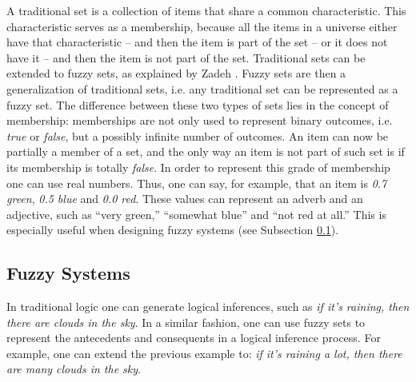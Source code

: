 A traditional set is a collection of items that share a common
characteristic. This characteristic serves as a membership, because all the
items in a universe either have that characteristic -- and then the item is part
of the set -- or it does not have it -- and then the item is not part of the
set. Traditional sets can be extended to fuzzy sets, as explained by Zadeh
\cite{Zadeh1965}. Fuzzy sets are then a generalization of traditional sets,
i.e. any traditional set can be represented as a fuzzy set. The difference
between these two types of sets lies in the concept of membership: memberships
are not only used to represent binary outcomes, i.e. \textit{true} or
\textit{false}, but a possibly infinite number of outcomes. An item can now be
partially a member of a set, and the only way an item is not part of such set is
if its membership is totally \textit{false}. In order to represent this grade of
membership one can use real numbers. Thus, one can say, for example, that an
item is \textit{0.7 green}, \textit{0.5 blue} and \textit{0.0 red}. These values
can represent an adverb and an adjective, such as ``very green,'' ``somewhat blue''
and ``not red at all.'' This is especially useful when designing fuzzy systems
(see Subsection \ref{subsection:fuzzy-systems}).


\subsection{Fuzzy Systems}
\label{subsection:fuzzy-systems}

In traditional logic one can generate logical inferences, such as \textit{if
  it's raining, then there are clouds in the sky}. In a similar fashion, one can
use fuzzy sets to represent the antecedents and consequents in a logical
inference process. For example, one can extend the previous example to:
\textit{if it's raining a lot, then there are many clouds in the sky}.

